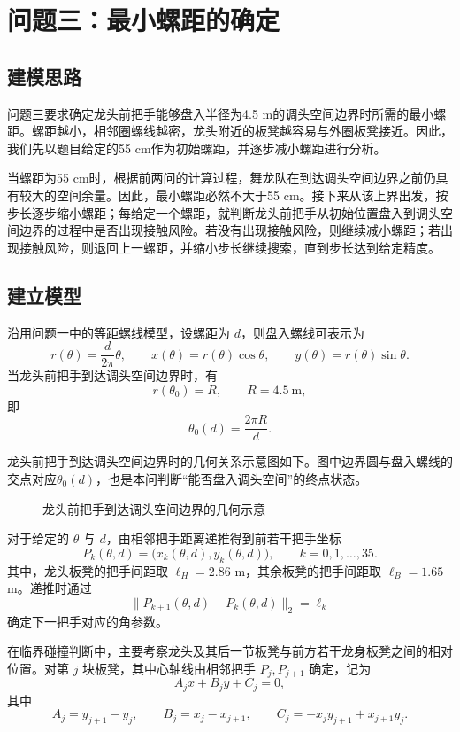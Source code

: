\section{问题三：最小螺距的确定}
\subsection{建模思路}
问题三要求确定龙头前把手能够盘入半径为4.5 m的调头空间边界时所需的最小螺距。螺距越小，相邻圈螺线越密，龙头附近的板凳越容易与外圈板凳接近。因此，我们先以题目给定的55 cm作为初始螺距，并逐步减小螺距进行分析。

当螺距为55 cm时，根据前两问的计算过程，舞龙队在到达调头空间边界之前仍具有较大的空间余量。因此，最小螺距必然不大于55 cm。接下来从该上界出发，按步长逐步缩小螺距；每给定一个螺距，就判断龙头前把手从初始位置盘入到调头空间边界的过程中是否出现接触风险。若没有出现接触风险，则继续减小螺距；若出现接触风险，则退回上一螺距，并缩小步长继续搜索，直到步长达到给定精度。

\subsection{建立模型}
沿用问题一中的等距螺线模型，设螺距为 \(d\)，则盘入螺线可表示为
\[
r(\theta)=\frac{d}{2\pi}\theta,\qquad
x(\theta)=r(\theta)\cos\theta,\qquad
y(\theta)=r(\theta)\sin\theta.
\]
当龙头前把手到达调头空间边界时，有
\[
r(\theta_0)=R,\qquad R=4.5\ \text{m},
\]
即
\[
\theta_0(d)=\frac{2\pi R}{d}.
\]

龙头前把手到达调头空间边界时的几何关系示意图如下。图中边界圆与盘入螺线的交点对应$\theta_0(d)$，也是本问判断“能否盘入调头空间”的终点状态。

\begin{figure}[H]
\centering
{}
\caption{龙头前把手到达调头空间边界的几何示意}
\label{fig:q3-boundary}
\end{figure}

对于给定的 \(\theta\) 与 \(d\)，由相邻把手距离递推得到前若干把手坐标
\[
P_k(\theta,d)=\bigl(x_k(\theta,d),y_k(\theta,d)\bigr),\qquad k=0,1,\ldots,35.
\]
其中，龙头板凳的把手间距取 \(\ell_H=2.86\) m，其余板凳的把手间距取 \(\ell_B=1.65\) m。递推时通过
\[
\|P_{k+1}(\theta,d)-P_k(\theta,d)\|_2=\ell_k
\]
确定下一把手对应的角参数。

在临界碰撞判断中，主要考察龙头及其后一节板凳与前方若干龙身板凳之间的相对位置。对第 \(j\) 块板凳，其中心轴线由相邻把手 \(P_j,P_{j+1}\) 确定，记为
\[
A_jx+B_jy+C_j=0,
\]
其中
\[
A_j=y_{j+1}-y_j,\qquad
B_j=x_j-x_{j+1},\qquad
C_j=-x_jy_{j+1}+x_{j+1}y_j.
\]

